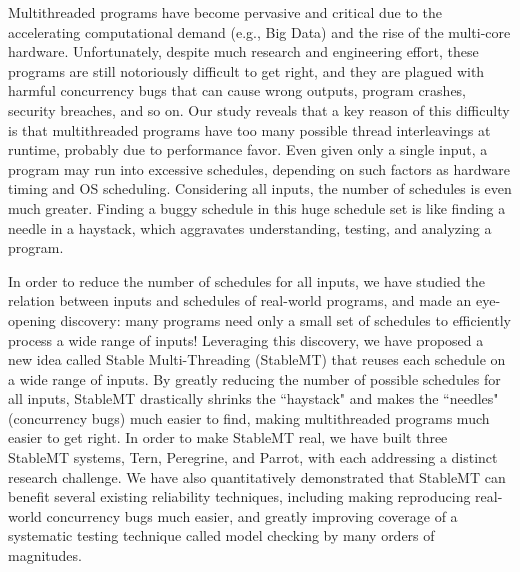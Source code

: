 Multithreaded programs have become pervasive and critical due to the accelerating computational demand (e.g., Big Data) and the rise of the multi-core hardware. Unfortunately, despite much research and engineering effort, these programs are still notoriously difficult to get right, and they are plagued with harmful concurrency bugs that can cause wrong outputs, program crashes, security breaches, and so on. Our study reveals that a key reason of this difficulty is that multithreaded programs have too many possible thread interleavings at runtime, probably due to performance favor. Even given only a single input, a program may run into excessive schedules, depending on such factors as hardware timing and OS scheduling. Considering all inputs, the number of schedules is even much greater. Finding a buggy schedule in this huge schedule set is like finding a needle in a haystack, which aggravates understanding, testing, and analyzing a program.

In order to reduce the number of schedules for all inputs, we have studied the relation between inputs and schedules of real-world programs, and made an eye-opening discovery: many programs need only a small set of schedules to efficiently process a wide range of inputs! Leveraging this discovery, we have proposed a new idea called Stable Multi-Threading (StableMT) that reuses each schedule on a wide range of inputs. By greatly reducing the number of possible schedules for all inputs, StableMT drastically shrinks the ``haystack" and makes the ``needles" (concurrency bugs) much easier to find, making multithreaded programs much easier to get right. In order to make StableMT real, we have built three StableMT systems, Tern, Peregrine, and Parrot, with each addressing a distinct research challenge. We have also quantitatively demonstrated that StableMT can benefit several existing reliability techniques, including making reproducing real-world concurrency bugs much easier, and greatly improving coverage of a systematic testing technique called model checking by many orders of magnitudes.

